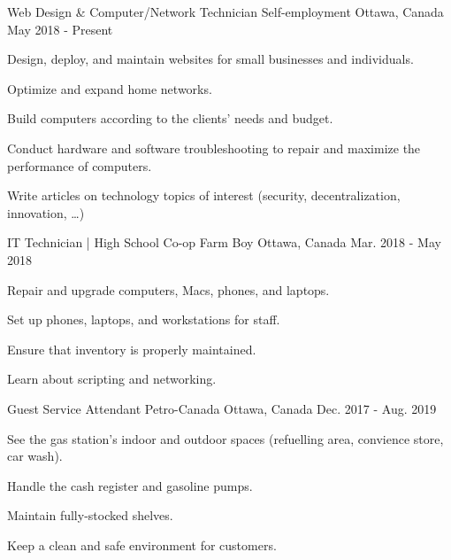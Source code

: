 \begin{cventries}
  \cventry
    {Web Design \& Computer/Network Technician} %
    {Self-employment} %
    {Ottawa, Canada} %
    {May 2018 - Present} %
    {
      \begin{cvitems} %
        \item {Design, deploy, and maintain websites for small businesses and individuals.}
        \item {Optimize and expand home networks.}
        \item {Build computers according to the clients' needs and budget.}
        \item {Conduct hardware and software troubleshooting to repair and maximize the performance of computers.}
        \item {Write articles on technology topics of interest (security, decentralization, innovation, …)}
      \end{cvitems}
    }

  \cventry
    {IT Technician | High School Co-op} %
    {Farm Boy} %
    {Ottawa, Canada} %
    {Mar. 2018 - May 2018} %
    {
      \begin{cvitems} %
        \item {Repair and upgrade computers, Macs, phones, and laptops.}
        \item {Set up phones, laptops, and workstations for staff.}
        \item {Ensure that inventory is properly maintained.}
        \item {Learn about scripting and networking.}
      \end{cvitems}
    }

  \cventry
    {Guest Service Attendant} %
    {Petro-Canada} %
    {Ottawa, Canada} %
    {Dec. 2017 - Aug. 2019} %
    {
      \begin{cvitems} %
        \item {See the gas station's indoor and outdoor spaces (refuelling area, convience store, car wash).}
        \item {Handle the cash register and gasoline pumps.}
        \item {Maintain fully-stocked shelves.}
        \item {Keep a clean and safe environment for customers.}
      \end{cvitems}
    }

\end{cventries}
